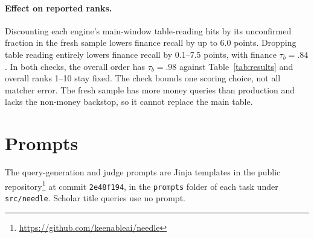 \documentclass[11pt]{article}
\begin{document}
\paragraph{Effect on reported ranks.}
Discounting each engine's main-window table-reading hits by its
unconfirmed fraction in the fresh sample lowers finance recall by up to
6.0 points. Dropping table reading entirely lowers finance recall by
0.1--7.5 points, with finance $\tau_b=.84$. In both checks, the overall
order has $\tau_b=.98$ against Table~\ref{tab:results} and overall ranks
1--10 stay fixed. The check bounds one scoring choice,
not all matcher error. The fresh sample has more money queries than
production and lacks the non-money backstop, so it cannot replace the
main table.

\section{Prompts}
\label{app:prompts}

The query-generation and judge prompts are Jinja templates in the public
repository\footnote{\url{https://github.com/keenableai/needle}} at commit
\texttt{2e48f194}, in the \texttt{prompts} folder of each task under
\texttt{src/needle}. Scholar title queries use no prompt.
\end{document}
